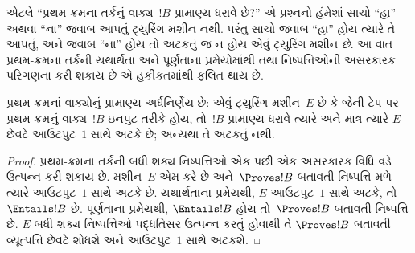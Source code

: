 \begin{explain}
એટલે ``પ્રથમ-ક્રમના તર્કનું વાક્ય~$!B$
પ્રામાણ્ય ધરાવે છે?'' એ પ્રશ્નનો હંમેશાં સાચો ``હા'' અથવા ``ના''
જવાબ આપતું ટ્યુરિંગ મશીન નથી. પરંતુ સાચો જવાબ
``હા'' હોય ત્યારે તે આપતું, અને જવાબ ``ના'' હોય તો
અટકતું જ ન હોય એવું ટ્યુરિંગ મશીન \emph{છે}.
આ વાત પ્રથમ-ક્રમના તર્કની યથાર્થતા અને પૂર્ણતાના
પ્રમેયોમાંથી તથા નિષ્પત્તિઓની અસરકારક પરિગણના
કરી શકાય છે એ હકીકતમાંથી ફલિત થાય છે.
\end{explain}

\begin{thm}
  પ્રથમ-ક્રમનાં વાક્યોનું પ્રામાણ્ય અર્ધનિર્ણેય
  છે: એવું ટ્યુરિંગ મશીન~$E$ છે કે જેની ટેપ પર
  પ્રથમ-ક્રમનું વાક્ય~$!B$ ઇનપુટ તરીકે હોય,
  તો~$!B$ પ્રામાણ્ય ધરાવે ત્યારે અને માત્ર ત્યારે
  $E$ છેવટે આઉટપુટ~$1$ સાથે અટકે છે; અન્યથા તે
  અટકતું નથી.
\end{thm}

\begin{proof}
  પ્રથમ-ક્રમના તર્કની બધી શક્ય નિષ્પત્તિઓ એક
  પછી એક અસરકારક વિધિ વડે ઉત્પન્ન કરી શકાય છે.
  મશીન~$E$ એમ કરે છે અને~$\Proves !B$ બતાવતી
  નિષ્પત્તિ મળે ત્યારે આઉટપુટ~$1$ સાથે અટકે છે.
  યથાર્થતાના પ્રમેયથી, $E$ આઉટપુટ~$1$ સાથે અટકે,
  તો~$\Entails !B$ છે. પૂર્ણતાના પ્રમેયથી,
  $\Entails !B$ હોય તો~$\Proves !B$ બતાવતી
  નિષ્પત્તિ છે. $E$ બધી શક્ય નિષ્પત્તિઓ
  પદ્ધતિસર ઉત્પન્ન કરતું હોવાથી તે
  $\Proves !B$ બતાવતી વ્યૂત્પત્તિ છેવટે
  શોધશે અને આઉટપુટ~$1$
  સાથે અટકશે.
\end{proof}
\endgroup


\begingroup
\makeatletter{}\makeatother

\label{guunit:OLP-0273}


